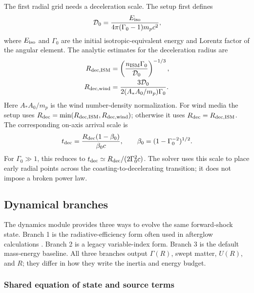 \documentclass[twocolumn]{aastex702}
\begin{document}
The first radial grid needs a deceleration scale.  The setup first defines
\begin{equation}
\mathcal{D}_0=
\frac{E_{\rm iso}}{4\pi(\Gamma_0-1)m_pc^2},
\end{equation}
where \(E_{\rm iso}\) and \(\Gamma_0\) are the initial isotropic-equivalent
energy and Lorentz factor of the angular element.  The analytic estimates for
the deceleration radius are
\begin{equation}
\begin{aligned}
R_{\rm dec,ISM}
&=\left(\frac{n_{\rm ISM}\Gamma_0}{\mathcal{D}_0}\right)^{-1/3},\\
R_{\rm dec,wind}
&=\frac{3\mathcal{D}_0}{2(A_\ast A_0/m_p)\Gamma_0}.
\end{aligned}
\end{equation}
Here \(A_\ast A_0/m_p\) is the wind number-density normalization.  For wind
media the setup uses \(R_{\rm dec}=\min(R_{\rm dec,ISM},R_{\rm dec,wind})\);
otherwise it uses \(R_{\rm dec}=R_{\rm dec,ISM}\).  The corresponding on-axis
arrival scale is
\[
t_{\rm dec}=\frac{R_{\rm dec}(1-\beta_0)}{\beta_0c},
\qquad
\beta_0=(1-\Gamma_0^{-2})^{1/2}.
\]
For \(\Gamma_0\gg1\), this reduces to
\(t_{\rm dec}\simeq R_{\rm dec}/(2\Gamma_0^2c)\).  The solver uses this scale to
place early radial points across the coasting-to-decelerating transition; it does
not impose a broken power law.

\subsection{Dynamical branches}

The dynamics module provides three ways to evolve the same forward-shock state.
Branch 1 is the radiative-efficiency form often used in afterglow calculations
\citep{BlandfordMcKee1976,HuangDaiLu1999}.  Branch 2 is a legacy
variable-index form.  Branch 3 is the default mass-energy baseline.  All three
branches output \(\Gamma(R)\), swept matter, \(U(R)\), and \(R\); they differ in
how they write the inertia and energy budget.

\subsubsection{Shared equation of state and source terms}
\end{document}
